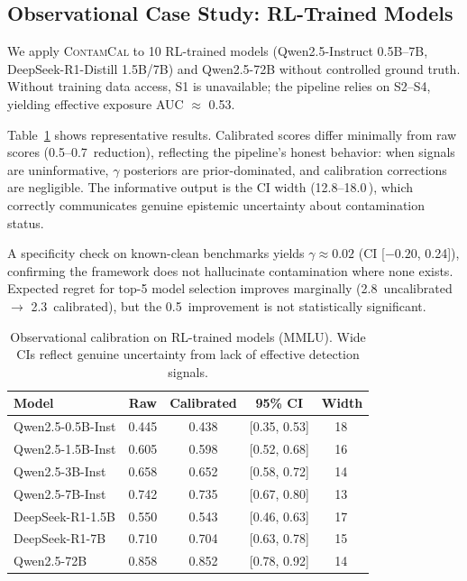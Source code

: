 \documentclass[11pt,a4paper]{article}
\newcommand{\method}{\textsc{ContamCal}}
\newcommand{\pp}{\,\text{pp}}
\begin{document}
\subsection{Observational Case Study: RL-Trained Models}
\label{sec:observational}

We apply \method{} to 10 RL-trained models (Qwen2.5-Instruct 0.5B--7B, DeepSeek-R1-Distill 1.5B/7B) and Qwen2.5-72B without controlled ground truth. Without training data access, S1 is unavailable; the pipeline relies on S2--S4, yielding effective exposure AUC $\approx$ 0.53.

Table~\ref{tab:observational} shows representative results. Calibrated scores differ minimally from raw scores (0.5--0.7\pp{} reduction), reflecting the pipeline's honest behavior: when signals are uninformative, $\gamma$ posteriors are prior-dominated, and calibration corrections are negligible. The informative output is the CI width (12.8--18.0\pp{}), which correctly communicates genuine epistemic uncertainty about contamination status.

A specificity check on known-clean benchmarks yields $\gamma \approx 0.02$ (CI [$-0.20$, 0.24]), confirming the framework does not hallucinate contamination where none exists. Expected regret for top-5 model selection improves marginally (2.8\pp{} uncalibrated $\to$ 2.3\pp{} calibrated), but the 0.5\pp{} improvement is not statistically significant.

\begin{table}[t]
\centering
\caption{Observational calibration on RL-trained models (MMLU). Wide CIs reflect genuine uncertainty from lack of effective detection signals.}
\label{tab:observational}
\small
\begin{tabular}{lcccc}
\toprule
\textbf{Model} & \textbf{Raw} & \textbf{Calibrated} & \textbf{95\% CI} & \textbf{Width} \\
\midrule
Qwen2.5-0.5B-Inst  & 0.445 & 0.438 & [0.35, 0.53] & 18\pp{} \\
Qwen2.5-1.5B-Inst  & 0.605 & 0.598 & [0.52, 0.68] & 16\pp{} \\
Qwen2.5-3B-Inst    & 0.658 & 0.652 & [0.58, 0.72] & 14\pp{} \\
Qwen2.5-7B-Inst    & 0.742 & 0.735 & [0.67, 0.80] & 13\pp{} \\
DeepSeek-R1-1.5B   & 0.550 & 0.543 & [0.46, 0.63] & 17\pp{} \\
DeepSeek-R1-7B     & 0.710 & 0.704 & [0.63, 0.78] & 15\pp{} \\
\midrule
Qwen2.5-72B        & 0.858 & 0.852 & [0.78, 0.92] & 14\pp{} \\
\bottomrule
\end{tabular}
\end{table}
\end{document}
